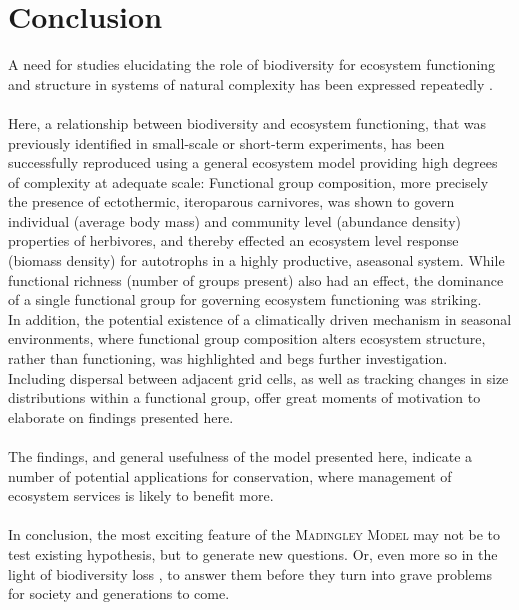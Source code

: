 \chapter{Conclusion}
A need for studies elucidating the role of biodiversity for ecosystem functioning and structure in systems of natural complexity has been expressed repeatedly \citep[e.g.][]{Hooper2012,Naeem2012,Tilman2014}.\\\\
Here, a relationship between biodiversity and ecosystem functioning, that was previously identified in small-scale or short-term experiments, has been successfully reproduced using a general ecosystem model providing high degrees of complexity at adequate scale:
Functional group composition, more precisely the presence of ectothermic, iteroparous carnivores, was shown to govern individual (average body mass) and community level (abundance density)  properties of herbivores, and thereby effected an ecosystem level response (biomass density) for autotrophs in a highly productive, aseasonal system. While functional richness (number of groups present) also had an effect, the dominance of a single functional group for governing ecosystem functioning was striking.  \\
In addition, the potential existence of a climatically driven mechanism in seasonal environments, where functional group composition alters ecosystem structure, rather than functioning, 
was highlighted and begs further investigation.\\
Including dispersal between adjacent grid cells, as well as tracking changes in size distributions within a functional group, offer great moments of motivation to elaborate on findings presented here. 
\\\\
The findings, and general usefulness of the model presented here, indicate a number of potential applications for conservation, where management of ecosystem services is likely to benefit more.
\\\\
In conclusion, the most exciting feature of the \textsc{Madingley Model} may not be to test existing hypothesis, but to generate new questions. Or, even more so in the light of biodiversity loss \citep{Ceballos2015, Urban2015}, to answer them before they turn into grave problems for society and generations to come. 
